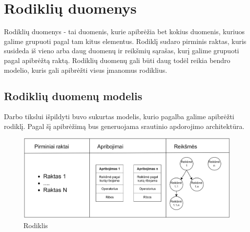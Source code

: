 \documentclass{VUMIFPSbakalaurinis}
\begin{document}
\section{Rodiklių duomenys}

Rodiklių duomenys - tai duomenis, kurie apibrėžia bet kokius duomenis, kuriuos galime grupuoti pagal tam kitus elementus. Rodiklį sudaro pirminis raktas, kuris susideda iš vieno arba daug duomenų ir reikšmių sąrašas, kurį galime grupuoti pagal apibrėžtą raktą.      
Rodiklių duomenų gali būti daug todėl reikia bendro modelio, kuris gali apibrėžti visus įmanomus rodiklius. 
\subsection{Rodiklių duomenų modelis}

Darbo tikslui išpildyti buvo sukurtas modelis, kurio pagalba galime apibrėžti rodiklį. Pagal šį apibrėžimą bus generuojama srautinio apdorojimo architektūra.

\begin{figure}[H]
    \centering
    \includegraphics[width=1\textwidth]{img/rodiklis.jpg}
    \caption{Rodiklis}
    \label{img:rodiklis}
\end{figure}
\end{document}
